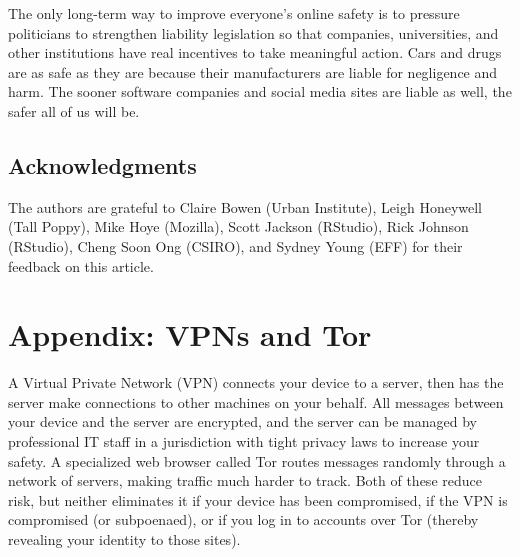 \documentclass[10pt,letterpaper]{article}
\begin{document}
The only long-term way to improve everyone's online safety is to pressure
politicians to strengthen liability legislation so that companies, universities,
and other institutions have real incentives to take meaningful action. Cars and
drugs are as safe as they are because their manufacturers are liable for
negligence and harm. The sooner software companies and social media sites are
liable as well, the safer all of us will be.

\subsection*{Acknowledgments}

The authors are grateful to Claire Bowen (Urban Institute), Leigh Honeywell
(Tall Poppy), Mike Hoye (Mozilla), Scott Jackson (RStudio), Rick Johnson
(RStudio), Cheng Soon Ong (CSIRO), and Sydney Young (EFF) for their feedback on
this article.



\section*{Appendix: VPNs and Tor}
  
A Virtual Private Network (VPN) connects your device to a server, then has the
server make connections to other machines on your behalf. All messages between
your device and the server are encrypted, and the server can be managed by
professional IT staff in a jurisdiction with tight privacy laws to increase your
safety. A specialized web browser called Tor routes messages randomly through a
network of servers, making traffic much harder to track. Both of these reduce
risk, but neither eliminates it if your device has been compromised, if the VPN
is compromised (or subpoenaed), or if you log in to accounts over Tor (thereby
revealing your identity to those sites).
\end{document}
